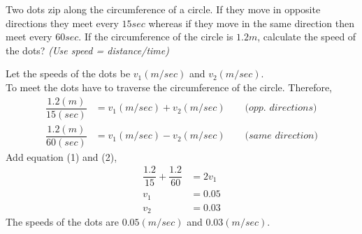 
%
%
%
%
% 
% 

\question Two dots zip along the circumference of a circle. If they move in opposite directions they meet every $15sec$ whereas if they move in the same direction then meet every $60sec$. If the circumference of the circle is $1.2m$, calculate the speed of the dots? \textit{(Use speed = distance/time)}

\insertQR{}

\ifprintanswers
\fi 

\begin{solution}
  Let the speeds of the dots be $v_1(m/sec)$ and $v_2(m/sec)$. \\
	  
  To meet the dots have to traverse the circumference of the circle. Therefore,
  \begin{align}
    \dfrac{1.2(m)}{15(sec)} &= v_1(m/sec)+v_2(m/sec) 
	\quad\quad\textit{(opp. directions)} \\
    \dfrac{1.2(m)}{60(sec)} &= v_1(m/sec)-v_2(m/sec) 
	\quad\quad\textit{(same direction)}
  \end{align}
  Add equation (1) and (2), 
  \begin{align}
    \dfrac{1.2}{15}+\dfrac{1.2}{60} &= 2v_1 \\
    v_1                             &= 0.05 \\
    v_2                             &= 0.03
  \end{align}
  The speeds of the dots are $0.05(m/sec)$ and $0.03(m/sec)$.
\end{solution}

